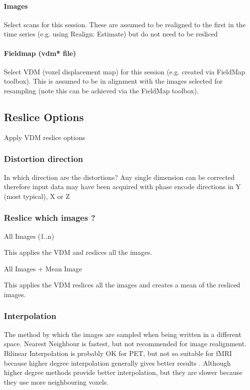 \paragraph{Images}
Select scans for this session. These are assumed to be realigned to the first in the time series (e.g. using Realign: Estimate) but do not need to be resliced


\paragraph{Fieldmap (vdm* file)}
Select VDM (voxel displacement map) for this session (e.g. created via FieldMap toolbox). This is assumed to be in alignment with the images selected for resampling (note this can be achieved via the FieldMap toolbox).


\subsection{Reslice Options}
Apply VDM reslice options


\subsubsection{Distortion direction}
In which direction are the distortions? Any single dimension can be corrected therefore input data may have been acquired with phase encode directions in Y (most typical), X or Z


\subsubsection{Reslice which images ?}
All Images (1..n) 

  This applies the VDM and reslices all the images. 

All Images + Mean Image 

   This applies the VDM reslices all the images and creates a mean of the resliced images.


\subsubsection{Interpolation}
The method by which the images are sampled when being written in a different space. Nearest Neighbour is fastest, but not recommended for image realignment. Bilinear Interpolation is probably OK for PET, but not so suitable for fMRI because higher degree interpolation generally gives better results \cite{thevenaz00a,unser93a,unser93b}. Although higher degree methods provide better interpolation, but they are slower because they use more neighbouring voxels.


